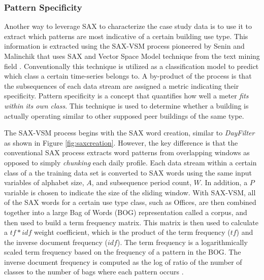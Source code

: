 \subsubsection{Pattern Specificity}
\label{sec:patternspec}

Another way to leverage SAX to characterize the case study data is to use it to extract which patterns are most indicative of a certain building use type. This information is extracted using the SAX-VSM process pioneered by Senin and Malinchik that uses SAX and Vector Space Model technique from the text mining field \cite{Senin_2013}. Conventionally this technique is utilized as a classification model to predict which class a certain time-series belongs to. A by-product of the process is that the subsequences of each data stream are assigned a metric indicating their specificity. Pattern specificity is a concept that quantifies how well a meter \emph{fits within its own class}. This technique is used to determine whether a building is actually operating similar to other supposed peer buildings of the same type.

The SAX-VSM process begins with the SAX word creation, similar to \emph{DayFilter} as shown in Figure \ref{fig:saxcreation}. However, the key difference is that the conventional SAX process extracts word patterns from overlapping windows as opposed to simply \emph{chunking} each daily profile. Each data stream within a certain class of a the training data set is converted to SAX words using the same input variables of alphabet size, $A$, and subsequence period count, $W$. In addition, a $P$ variable is chosen to indicate the size of the sliding window. With SAX-VSM, all of the SAX words for a certain use type class, such as Offices, are then combined together into a large Bag of Words (BOG) representation called a corpus, and then used to build a term frequency matrix. This matrix is then used to calculate a $tf*idf$ weight coefficient, which is the product of the term frequency ($tf$) and the inverse document frequency ($idf$). The term frequency is a logarithmically scaled term frequency based on the frequency of a pattern in the BOG. The inverse document frequency is computed as the log of ratio of the number of classes to the number of bags where each pattern occurs \cite{Manning}. 